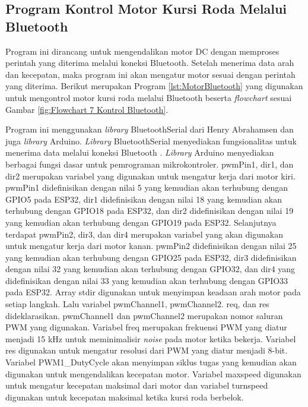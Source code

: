 \subsection{Program Kontrol Motor Kursi Roda Melalui Bluetooth}

Program ini dirancang untuk mengendalikan motor DC dengan memproses perintah yang diterima melalui koneksi Bluetooth. Setelah menerima data arah dan kecepatan, maka program ini akan mengatur motor sesuai dengan perintah yang diterima. Berikut merupakan Program \ref{lst:MotorBluetooth} yang digunakan untuk mengontrol motor kursi roda melalui Bluetooth beserta \emph{flowchart} sesuai Gambar \ref{fig:Flowchart 7 Kontrol Bluetooth}.

Program ini menggunakan \emph{library} BluetoothSerial dari Henry Abrahamsen dan juga \emph{library} Arduino. \emph{Library} BluetoothSerial menyediakan fungsionalitas untuk menerima data melalui koneksi Bluetooth \parencite{Abrahamsen_2023}. \emph{Library} Arduino menyediakan berbagai fungsi dasar untuk pemrograman mikrokontroler. pwmPin1, dir1, dan dir2 merupakan variabel yang digunakan untuk mengatur kerja dari motor kiri. pwmPin1 didefinisikan dengan nilai 5 yang kemudian akan terhubung dengan GPIO5 pada ESP32, dir1 didefinisikan dengan nilai 18 yang kemudian akan terhubung dengan GPIO18 pada ESP32, dan dir2 didefinisikan dengan nilai 19 yang kemudian akan terhubung dengan GPIO19 pada ESP32. Selanjutnya terdapat pwmPin2, dir3, dan dir4 merupakan variabel yang akan digunakan untuk mengatur kerja dari motor kanan. pwmPin2 didefinisikan dengan nilai 25 yang kemudian akan terhubung dengan GPIO25 pada ESP32, dir3 didefinisikan dengan nilai 32 yang kemudian akan terhubung dengan GPIO32, dan dir4 yang didefinisikan dengan nilai 33 yang kemudian akan terhubung dengan GPIO33 pada ESP32. Array stdir digunakan untuk menyimpan keadaan arah motor pada setiap langkah. Lalu variabel pwmChannel1, pwmChannel2. req, dan res dideklarasikan. pwmChannel1 dan pwmChannel2 merupakan nomor saluran PWM yang digunakan. Variabel freq merupakan frekuensi PWM yang diatur menjadi 15 kHz untuk meminimalisir \emph{noise} pada motor ketika bekerja. Variabel res digunakan untuk mengatur resolusi dari PWM yang diatur menjadi 8-bit. Variabel PWM1\_DutyCycle akan menyimpan siklus tugas yang kemudian akan digunakan untuk mengendalikan kecepatan motor. Variabel maxspeed digunakan untuk mengatur kecepatan maksimal dari motor dan variabel turnspeed digunakan untuk kecepatan maksimal ketika kursi roda berbelok.

